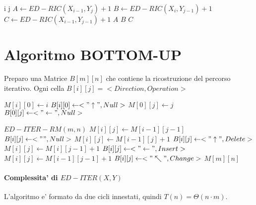 \begin{algorithm}
    \begin{algorithmic}
                \State \Return i
                \State \Return j
            \Else
                \State $A \gets ED-RIC(X_{i-1}, Y_{j}) + 1$
                \State $B \gets ED-RIC(X_{i}, Y_{j-1}) + 1$
                \State $C \gets ED-RIC(X_{i-1}, Y_{j-1}) + 1$
                    \State \Return $A$
                    \State \Return $B$
                \Else
                    \State \Return $C$
                \EndIf
            \EndIf
        \EndProcedure
    \end{algorithmic}
\end{algorithm}

\section{Algoritmo BOTTOM-UP}

Preparo una Matrice $B[m][n]$ che contiene la ricostruzione del percorso iterativo.
Ogni cella $B[i][j] = <Direction, Operation>$

\begin{algorithm}
    \begin{algorithmic}
                \State $M[i][0] \gets i$
                \State $B[i][0] \gets <"\uparrow", Null>$
            \EndFor
                \State $M[0][j] \gets j$
                \State $B[0][j] \gets <"\leftarrow", Null>$
            \EndFor
        \EndProcedure
    \end{algorithmic}
\end{algorithm}

\begin{algorithm}
    \begin{algorithmic}
            \State $ED-ITER-RM(m, n)$
                        \State $M[i][j] \gets M[i-1][j-1]$
                        \State $B[i][j] \gets <"", Null>$
                        \State $M[i][j] \gets M[i-1][j] + 1$
                        \State $B[i][j] \gets <"\uparrow", Delete>$
                        \State $M[i][j] \gets M[i][j-1] + 1$
                        \State $B[i][j] \gets <"\leftarrow", Insert>$
                    \Else
                        \State $M[i][j] \gets M[i-1][j-1] + 1$
                        \State $B[i][j] \gets <"\nwarrow", Change>$
                    \EndIf
                \EndFor
            \EndFor
            \State \Return $M[m][n]$
        \EndProcedure
    \end{algorithmic}
\end{algorithm}

\paragraph{Complessita' di $ED-ITER(X, Y)$}

L'algoritmo e' formato da due cicli innestati, quindi $T(n) = \Theta(n \cdot m)$.